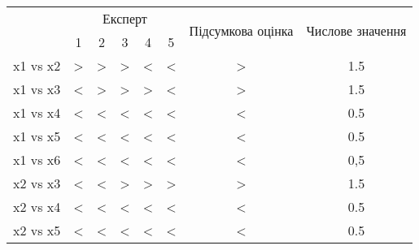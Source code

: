 \documentclass[a4paper,14pt]{extreport}
\begin{document}
\begin{table}[h]
\begin{center}
\begin{tabular}{|c|ccccc|c|c|}
\hline
\multirow{2}{*}{} & \multicolumn{5}{c|}{Експерт}                                                                          & \multirow{2}{*}{Підсумкова оцінка} & \multirow{2}{*}{Числове значення} \\ \cline{2-6}
                  & \multicolumn{1}{c|}{1} & \multicolumn{1}{c|}{2} & \multicolumn{1}{c|}{3} & \multicolumn{1}{c|}{4} & 5 &                                    &                                   \\ \hline
x1 vs  x2         & \multicolumn{1}{c|}{>} & \multicolumn{1}{c|}{>} & \multicolumn{1}{c|}{>} & \multicolumn{1}{c|}{<} & < & >                                  & 1.5                               \\ \hline
x1 vs x3          & \multicolumn{1}{c|}{<} & \multicolumn{1}{c|}{>} & \multicolumn{1}{c|}{>} & \multicolumn{1}{c|}{>} & < & >                                  & 1.5                               \\ \hline
x1 vs x4          & \multicolumn{1}{c|}{<} & \multicolumn{1}{c|}{<} & \multicolumn{1}{c|}{<} & \multicolumn{1}{c|}{<} & < & <                                  & 0.5                               \\ \hline
x1 vs x5          & \multicolumn{1}{c|}{<} & \multicolumn{1}{c|}{<} & \multicolumn{1}{c|}{<} & \multicolumn{1}{c|}{<} & < & <                                  & 0.5                               \\ \hline
x1 vs x6          & \multicolumn{1}{c|}{<} & \multicolumn{1}{c|}{<} & \multicolumn{1}{c|}{<} & \multicolumn{1}{c|}{<} & < & <                                  & 0,5                               \\ \hline
x2 vs x3          & \multicolumn{1}{c|}{<} & \multicolumn{1}{c|}{<} & \multicolumn{1}{c|}{>} & \multicolumn{1}{c|}{>} & > & >                                  & 1.5                               \\ \hline
x2 vs x4          & \multicolumn{1}{c|}{<} & \multicolumn{1}{c|}{<} & \multicolumn{1}{c|}{<} & \multicolumn{1}{c|}{<} & < & <                                  & 0.5                               \\ \hline
x2 vs x5          & \multicolumn{1}{c|}{<} & \multicolumn{1}{c|}{<} & \multicolumn{1}{c|}{<} & \multicolumn{1}{c|}{<} & < & <                                  & 0.5                               \\ \hline

\end{tabular}
\end{center}
\end{table}
\end{document}
